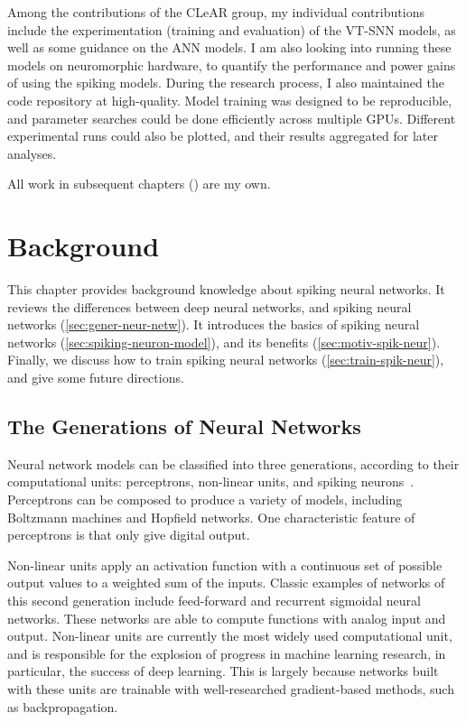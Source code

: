 \documentclass[fyp]{socreport}
\begin{document}
Among the contributions of the CLeAR group, my individual contributions include
the experimentation (training and evaluation) of the VT-SNN models, as well as
some guidance on the ANN models. I am also looking into running these models on
neuromorphic hardware, to quantify the performance and power gains of using the
spiking models. During the research process, I also maintained the code
repository at high-quality. Model training was designed to be reproducible, and
parameter searches could be done efficiently across multiple GPUs. Different
experimental runs could also be plotted, and their results aggregated for later
analyses.

All work in subsequent chapters ()
are my own.

\chapter{Background\label{cha:background}}

This chapter provides background knowledge about spiking neural networks. It
reviews the differences between deep neural networks, and spiking neural
networks (\ref{sec:gener-neur-netw}). It introduces the basics of spiking neural
networks (\ref{sec:spiking-neuron-model}), and its benefits
(\ref{sec:motiv-spik-neur}). Finally, we discuss how to train spiking neural
networks (\ref{sec:train-spik-neur}), and give some future directions.

\section{The Generations of Neural Networks\label{sec:gener-neur-netw}}

Neural network models can be classified into three generations, according to
their computational units: perceptrons, non-linear units, and spiking
neurons~\cite{MAASS19971659}. Perceptrons can be composed to produce a variety
of models, including Boltzmann machines and Hopfield networks. One
characteristic feature of perceptrons is that only give digital output.

Non-linear units apply an activation function with a continuous set of possible
output values to a weighted sum of the inputs. Classic examples of networks of
this second generation include feed-forward and recurrent sigmoidal neural
networks. These networks are able to compute functions with analog input and
output. Non-linear units are currently the most widely used computational unit,
and is responsible for the explosion of progress in machine learning research,
in particular, the success of deep learning. This is largely because networks
built with these units are trainable with well-researched gradient-based
methods, such as backpropagation.
\end{document}
